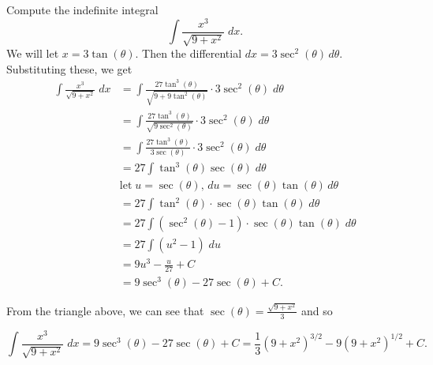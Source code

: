 \documentclass{ximera}
\begin{document}
\begin{example}[example 10]
Compute the indefinite integral
\[
\int \frac{x^3}{\sqrt{9 + x^2}} \; dx.
\]
We will let $x = 3\tan(\theta)$. Then the differential
$dx = 3\sec^2(\theta) \, d\theta$.  Substituting these, we get
\begin{align*}
\int \frac{x^3}{\sqrt{9 + x^2}} \; dx &= \int \frac{27\tan^3(\theta)}{\sqrt{9 + 9\tan^2(\theta)}} \cdot 3\sec^2(\theta) \; d\theta\\[6pt]
                                      &= \int \frac{27\tan^3(\theta)}{\sqrt{9\sec^2(\theta)}} \cdot 3\sec^2(\theta) \; d\theta\\[6pt]
                                      &= \int \frac{27\tan^3(\theta)}{3\sec(\theta)} \cdot 3\sec^2(\theta) \; d\theta\\[6pt]
                                      &= 27\int \tan^3(\theta) \sec(\theta) \; d\theta\\[6pt]
                                      & \text{let} \; u = \sec(\theta), \, du = \sec(\theta) \tan(\theta) \, d\theta\\[6pt]
                                      &= 27\int \tan^2(\theta) \cdot \sec(\theta) \tan(\theta) \; d\theta\\[6pt]
                                      &= 27\int \left(\sec^2(\theta)-1\right) \cdot \sec(\theta) \tan(\theta) \; d\theta\\[6pt]
                                      &= 27\int (u^2-1) \; du\\[6pt]
                                      &= 9u^3 - \frac{u}{27} + C\\[6pt]
                                      &= 9\sec^3(\theta) - 27 \sec(\theta) + C.
\end{align*}



\begin{image}
\end{image}



From the triangle above, we can see that $\sec(\theta) = \frac{\sqrt{9+x^2}}{3}$ and so

\[
\int \frac{x^3}{\sqrt{9 + x^2}} \; dx = 9\sec^3(\theta) - 27 \sec(\theta) + C = \frac13 (9+x^2)^{3/2} - 9(9+x^2)^{1/2} + C.
\]
\end{example}
\end{document}
